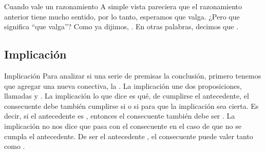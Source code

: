 
\begin{frame}{Cuando vale un razonamiento}
  A simple vista pareciera que el razonamiento anterior tiene mucho sentido,
  por lo tanto, esperamos que valga.
  \jump
  ¿Pero que significa ``que valga''?
  \jump
  Como ya dijimos, . En otras palabras,
  decimos que .
\end{frame}


\subsection{Implicación}


\begin{frame}{Implicación}
  Para analizar si una serie de premisas 
  la conclusión, primero tenemos que agregar una nueva conectiva, la
  .
  \jump
  La implicación une dos proposiciones, llamadas  y
  .
  \jump
  La implicación lo que dice es qué, de cumplirse el antecedente,
  el consecuente debe también cumplirse si o si para que la implicación
  sea cierta. Es decir, si el antecedente es \fulltrue, entonces el
  consecuente también debe ser \fulltrue.
  \jump
  La implicación no nos dice que pasa con el consecuente en el caso de que
  no se cumpla el antecedente. De ser el antecedente \fullfalse, el consecuente
  puede valer tanto \fullfalse como \fulltrue.
\end{frame}


